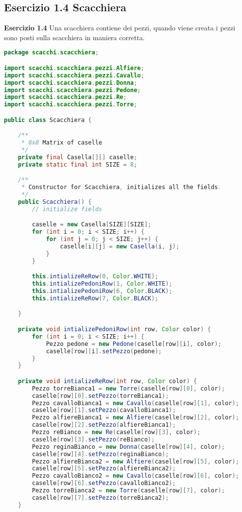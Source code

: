 \documentclass{article}
\begin{document}
\subsection{Esercizio 1.4 Scacchiera}
\begin{framed}
\textbf{Esercizio 1.4} Una scacchiera contiene dei pezzi, quando viene creata i pezzi sono posti sulla scacchiera in maniera corretta.
\end{framed}
\begin{lstlisting}[language=Java,escapechar=|]
package scacchi.scacchiera;

import scacchi.scacchiera.pezzi.Alfiere;
import scacchi.scacchiera.pezzi.Cavallo;
import scacchi.scacchiera.pezzi.Donna;
import scacchi.scacchiera.pezzi.Pedone;
import scacchi.scacchiera.pezzi.Re;
import scacchi.scacchiera.pezzi.Torre;

public class Scacchiera {

	/**
	 * 8x8 Matrix of caselle
	 */
	private final Casella[][] caselle;
	private static final int SIZE = 8;

	/**
	 * Constructor for Scacchiera, initializes all the fields.
	 */
	public Scacchiera() {
		// initialize fields

		caselle = new Casella[SIZE][SIZE];
		for (int i = 0; i < SIZE; i++) {
			for (int j = 0; j < SIZE; j++) {
				caselle[i][j] = new Casella(i, j);
			}
		}

		this.intializeReRow(0, Color.WHITE);
		this.intializePedoniRow(1, Color.WHITE);
		this.intializePedoniRow(6, Color.BLACK);
		this.intializeReRow(7, Color.BLACK);

	}

	private void intializePedoniRow(int row, Color color) {
		for (int i = 0; i < SIZE; i++) {
			Pezzo pedone = new Pedone(caselle[row][i], color);
			caselle[row][i].setPezzo(pedone);
		}
	}

	private void intializeReRow(int row, Color color) {
		Pezzo torreBianca1 = new Torre(caselle[row][0], color);
		caselle[row][0].setPezzo(torreBianca1);
		Pezzo cavalloBianca1 = new Cavallo(caselle[row][1], color);
		caselle[row][1].setPezzo(cavalloBianca1);
		Pezzo alfiereBianca1 = new Alfiere(caselle[row][2], color);
		caselle[row][2].setPezzo(alfiereBianca1);
		Pezzo reBianco = new Re(caselle[row][3], color);
		caselle[row][3].setPezzo(reBianco);
		Pezzo reginaBianco = new Donna(caselle[row][4], color);
		caselle[row][4].setPezzo(reginaBianco);
		Pezzo alfiereBianca2 = new Alfiere(caselle[row][5], color);
		caselle[row][5].setPezzo(alfiereBianca2);
		Pezzo cavalloBianco2 = new Cavallo(caselle[row][6], color);
		caselle[row][6].setPezzo(cavalloBianco2);
		Pezzo torreBianca2 = new Torre(caselle[row][7], color);
		caselle[row][7].setPezzo(torreBianca2);
	}


\end{lstlisting}
\end{document}
